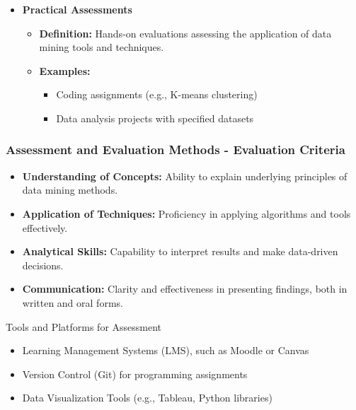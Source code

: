 \documentclass[aspectratio=169]{beamer}
\begin{document}
\begin{frame}[fragile]
\begin{itemize}
        \item \textbf{Practical Assessments}
            \begin{itemize}
                \item \textbf{Definition:} Hands-on evaluations assessing the application of data mining tools and techniques.
                \item \textbf{Examples:}
                    \begin{itemize}
                        \item Coding assignments (e.g., K-means clustering)
                        \item Data analysis projects with specified datasets
                    \end{itemize}
            \end{itemize}
    \end{itemize}
\end{frame}

\begin{frame}[fragile]
    \frametitle{Assessment and Evaluation Methods - Evaluation Criteria}
    \begin{itemize}
        \item \textbf{Understanding of Concepts:} 
            Ability to explain underlying principles of data mining methods.
        \item \textbf{Application of Techniques:} 
            Proficiency in applying algorithms and tools effectively.
        \item \textbf{Analytical Skills:} 
            Capability to interpret results and make data-driven decisions.
        \item \textbf{Communication:} 
            Clarity and effectiveness in presenting findings, both in written and oral forms.
    \end{itemize}

    \begin{block}{Tools and Platforms for Assessment}
        \begin{itemize}
            \item Learning Management Systems (LMS), such as Moodle or Canvas
            \item Version Control (Git) for programming assignments
            \item Data Visualization Tools (e.g., Tableau, Python libraries)
        \end{itemize}
    \end{block}
\end{frame}
\end{document}
